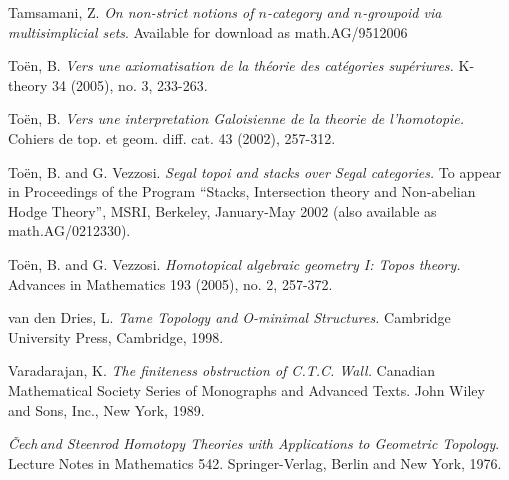 \documentclass{report}[10pt, final]
\newcommand{\Cech}{\v{C}ech\,}
\theoremstyle{definition}
\begin{document}
\begin{thebibliography}{99}
 Tamsamani, Z. {\it On non-strict notions
of $n$-category and $n$-groupoid via multisimplicial sets}. Available for download as
math.AG/9512006

 To\"{e}n, B. {\it Vers une axiomatisation de la th\'{e}orie des cat\'{e}gories sup\'{e}riures.} K-theory 34 (2005), no. 3, 233-263.

 To\"{e}n, B. {\it Vers une interpretation Galoisienne de la theorie de l'homotopie.} Cohiers de top. et geom. diff. cat. 43 (2002), 257-312.

 To\"{e}n, B. and G. Vezzosi.
{\it Segal topoi and stacks over Segal categories.} To appear in Proceedings of the Program ``Stacks, Intersection theory and Non-abelian Hodge Theory'', MSRI, Berkeley, January-May 2002 (also available as math.AG/0212330). 

 To\"{e}n, B. and G. Vezzosi. {\it Homotopical algebraic geometry I: Topos theory.} Advances in Mathematics 193 (2005), no. 2, 257-372.

 van den Dries, L. {\it Tame Topology and O-minimal
Structures.} Cambridge University Press, Cambridge, 1998.

 Varadarajan, K. {\it The finiteness obstruction of C.T.C. Wall.}
Canadian Mathematical Society Series of Monographs and Advanced Texts. John Wiley and Sons, Inc., New York, 1989.

 {\it \Cech and Steenrod Homotopy Theories
with Applications to Geometric Topology}. Lecture Notes in
Mathematics 542. Springer-Verlag, Berlin and New York, 1976.
\end{thebibliography}

\end{document}
